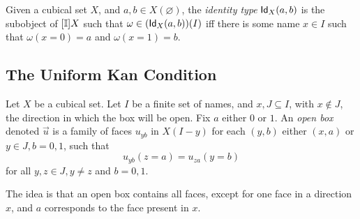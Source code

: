 \begin{definition}
  Given a cubical set $X$, and $a, b \in X(\varnothing)$, the \emph{identity type} $\mathsf{Id}_X(a,b)$ is the subobject of $[\mathbb{I}]X$ such that
  $\omega \in (\mathsf{Id}_X(a,b))(I)$ iff there is some name $x \in I$ such that $\omega(x =  0) = a$ and $\omega(x = 1) = b$. 
\end{definition}

\subsection{The Uniform Kan Condition}

\begin{definition} 
  Let $X$ be a cubical set. Let $I$ be a finite set of names, and $x, J \subseteq I$, with $x \notin J$, the direction in which the box will be open.
  Fix $a$ either $0$ or $1$.
  An \emph{open box} denoted $\vec{u}$ is a family of faces $u_{yb}$ in $X(I - y)$ for each $(y,b)$ either $(x,a)$ or $y \in J, b = 0,1$,
  such that \[u_{yb} (z = a) = u_{za}(y = b)\] for all $y, z \in J, y \neq z$ and $b = 0, 1$.
\end{definition}
The idea is that an open box contains all faces, except for one face in a direction $x$, and $a$ corresponds to the face present in $x$.

